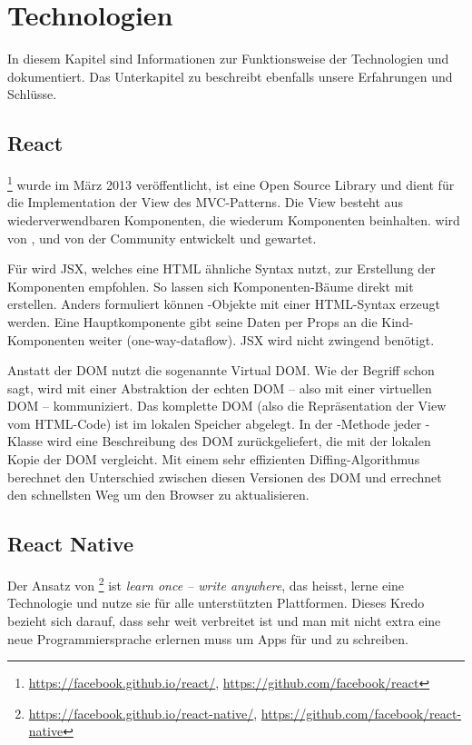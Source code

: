 \chapter{Technologien}
\label{pd-technologien}
In diesem Kapitel sind Informationen zur Funktionsweise der Technologien  und  dokumentiert. 
Das Unterkapitel zu  beschreibt ebenfalls unsere Erfahrungen und Schlüsse.


\section{React} 
\footnote{\url{https://facebook.github.io/react/}, \url{https://github.com/facebook/react}} wurde im März 2013 veröffentlicht\cite{react-release}, ist eine Open Source  \gls{Library} und dient für die Implementation der View des \gls{MVC}-Patterns. 
Die View besteht aus wiederverwendbaren Komponenten, die wiederum Komponenten beinhalten.
 wird von ,  und von der Community entwickelt und gewartet.\cite{react}

Für  wird \gls{JSX}, welches eine HTML ähnliche Syntax nutzt, zur Erstellung der Komponenten empfohlen. 
So lassen sich Komponenten-Bäume direkt mit  erstellen. 
Anders formuliert können -Objekte mit einer HTML-Syntax erzeugt werden. 
Eine Hauptkomponente gibt seine Daten per Props an die Kind-Komponenten weiter (one-way-dataflow).\cite{react-data-flow}
\gls{JSX} wird nicht zwingend benötigt.\cite{jsx-syntax}

Anstatt der \gls{DOM} nutzt  die sogenannte \gls{Virtual DOM}.
Wie der Begriff schon sagt, wird mit einer Abstraktion der echten \gls{DOM} -- also mit einer virtuellen DOM -- kommuniziert.
Das komplette \gls{DOM} (also die Repräsentation der View vom HTML-Code) ist im lokalen Speicher abgelegt.\cite{virtual-dom}
In der -Methode jeder -Klasse wird eine Beschreibung des DOM zurückgeliefert, die  mit der lokalen Kopie der \gls{DOM} vergleicht.
Mit einem sehr effizienten Diffing-Algorithmus berechnet  den Unterschied zwischen diesen  Versionen des \gls{DOM} und errechnet den schnellsten Weg um den Browser zu aktualisieren.\cite{react-virtual-dom}


\section{React Native}
Der Ansatz von \footnote{\url{https://facebook.github.io/react-native/}, \url{https://github.com/facebook/react-native}} ist \textit{learn once -- write anywhere}, das heisst, lerne eine Technologie und nutze sie für alle unterstützten Plattformen.\cite{react-native}
Dieses Kredo bezieht sich darauf, dass  sehr weit verbreitet ist und man mit  nicht extra eine neue Programmiersprache erlernen muss um Apps für  und  zu schreiben.

